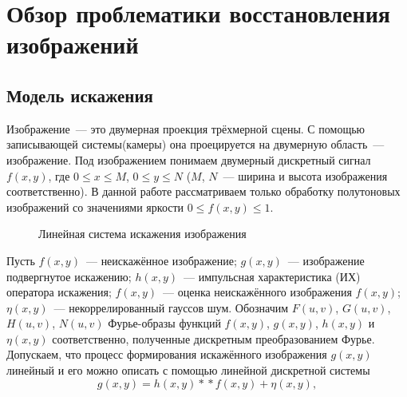 \chapter{Обзор проблематики восстановления изображений}

\section{Модель искажения}
Изображение~--- это двумерная проекция трёхмерной сцены. С помощью записывающей системы(камеры) она проецируется на двумерную область~--- изображение. Под изображением понимаем двумерный дискретный сигнал $f(x,y)$, где $0\leq x \leq M$, $0\leq y\leq N$ ($M$, $N$~--- ширина и высота изображения соответственно). В данной работе рассматриваем только обработку полутоновых изображений со значениями яркости $0\leq f(x,y)\leq 1$.

\begin{figure}[h]
    \centering
    \caption{Линейная система искажения изображения}
    \label{fig:distortionScheme}
\end{figure}

Пусть $f(x,y)$~--- неискажённое изображение; $g(x,y)$~--- изображение подвергнутое искажению; $h(x,y)$~--- импульсная характеристика (ИХ) оператора искажения; $\hat{f}(x,y)$~--- оценка неискажённого изображения $f(x,y)$; $\eta(x,y)$~--- некоррелированный гауссов шум. Обозначим $F(u,v)$, $G(u,v)$, $H(u,v)$, $N(u,v)$ Фурье-образы функций $f(x,y)$, $g(x,y)$, $h(x,y)$ и $\eta(x,y)$ соответственно, полученные дискретным преобразованием Фурье\cite[стр.~332]{gonsalesDigital2012}.
Допускаем, что процесс формирования искажённого изображения $g(x, y)$ линейный и его можно описать с помощью линейной дискретной системы \cite[стр.~403]{gonsalesDigital2012}
\begin{equation}\label{eq:distortion}
g(x, y) = h(x,y) *\!*f(x,y) + \eta(x,y),
\end{equation}

